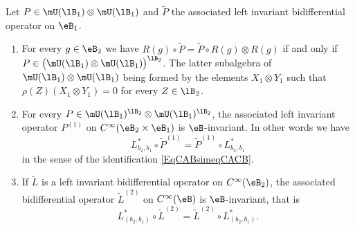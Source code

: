 \begin{proposition}		\label{PropPBBPtildeComm}
	Let $P\in\mU(\lB_1)\otimes\mU(\lB_1)$ and $\tilde P$ the associated left invariant bidifferential operator on $\eB_1$.
	\begin{enumerate}

		\item\label{ItemPropPBBPtildeCommi}
			For every $g\in\eB_2$ we have $R(g)\circ\tilde P=\tilde P\circ R(g)\otimes R(g)$ if and only if $P\in\big( \mU(\lB_1)\otimes\mU(\lB_1) \big)^{\lB_2}$. The latter subalgebra of $\mU(\lB_1)\otimes\mU(\lB_1)$ being formed by the elements $X_1\otimes Y_1$ such that $\rho(Z)(X_1\otimes Y_1)=0$ for every $Z\in\lB_2$.

		\item\label{ItemPropPBBPtildeCommii}
			For every $P\in\mU(\lB_1)^{\lB_2}\otimes\mU(\lB_1)^{\lB_2}$, the associated left invariant operator $P^{(1)}$ on $ C^{\infty}(\eB_2\times \eB_1)$ is $\eB$-invariant. In other words we have
			\begin{equation}
				L^*_{b_2,b_1}\circ\tilde P^{(1)}=\tilde P^{(1)}\circ L^*_{b_2,b_1}
			\end{equation}
			in the sense of the identification \eqref{EqCABsimeqCACB}.
		\item\label{ItemPropPBBPtildeCommiii}
			If $\tilde L$ is a left invariant bidifferential operator on $ C^{\infty}(\eB_2)$, the associated bidifferential operator $\tilde L^{(2)}$ on $ C^{\infty}(\eB)$ is $\eB$-invariant, that is
			\begin{equation}
				L^*_{(b_2,b_1)}\circ \tilde L^{(2)}=\tilde L^{(2)}\circ L^*_{(b_2,b_1)}.
			\end{equation}
	\end{enumerate}
	
\end{proposition}

